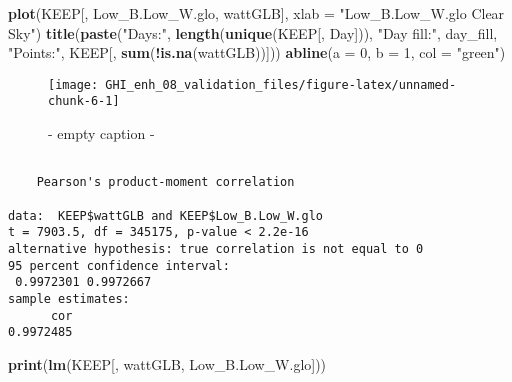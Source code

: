 \documentclass[
  10pt,
  a4paper,oneside]{article}
\newenvironment{Shaded}{\begin{snugshade}}{\end{snugshade}}
\newcommand{\AttributeTok}[1]{\textcolor[rgb]{0.13,0.29,0.53}{#1}}
\newcommand{\DecValTok}[1]{\textcolor[rgb]{0.00,0.00,0.81}{#1}}
\newcommand{\FunctionTok}[1]{\textcolor[rgb]{0.13,0.29,0.53}{\textbf{#1}}}
\newcommand{\NormalTok}[1]{#1}
\newcommand{\SpecialCharTok}[1]{\textcolor[rgb]{0.81,0.36,0.00}{\textbf{#1}}}
\newcommand{\StringTok}[1]{\textcolor[rgb]{0.31,0.60,0.02}{#1}}
\begin{document}
\newpage

\begin{Shaded}
\begin{Highlighting}[]
\FunctionTok{plot}\NormalTok{(KEEP[, Low\_B.Low\_W.glo, wattGLB], }\AttributeTok{xlab =} \StringTok{"Low\_B.Low\_W.glo Clear Sky"}\NormalTok{)}
\FunctionTok{title}\NormalTok{(}\FunctionTok{paste}\NormalTok{(}\StringTok{"Days:"}\NormalTok{, }\FunctionTok{length}\NormalTok{(}\FunctionTok{unique}\NormalTok{(KEEP[, Day])), }\StringTok{"Day fill:"}\NormalTok{, day\_fill, }\StringTok{"Points:"}\NormalTok{, KEEP[, }\FunctionTok{sum}\NormalTok{(}\SpecialCharTok{!}\FunctionTok{is.na}\NormalTok{(wattGLB))]))}
\FunctionTok{abline}\NormalTok{(}\AttributeTok{a =} \DecValTok{0}\NormalTok{, }\AttributeTok{b =} \DecValTok{1}\NormalTok{, }\AttributeTok{col =} \StringTok{"green"}\NormalTok{)}
\end{Highlighting}
\end{Shaded}

\begin{figure}[H]

{\centering \texttt{[image: GHI\_enh\_08\_validation\_files/figure-latex/unnamed-chunk-6-1]} 

}

\caption{ - empty caption - }\label{fig:unnamed-chunk-6}
\end{figure}

\begin{Shaded}
\end{Shaded}

\begin{verbatim}

    Pearson's product-moment correlation

data:  KEEP$wattGLB and KEEP$Low_B.Low_W.glo
t = 7903.5, df = 345175, p-value < 2.2e-16
alternative hypothesis: true correlation is not equal to 0
95 percent confidence interval:
 0.9972301 0.9972667
sample estimates:
      cor 
0.9972485 
\end{verbatim}

\begin{Shaded}
\begin{Highlighting}[]
\FunctionTok{print}\NormalTok{(}\FunctionTok{lm}\NormalTok{(KEEP[, wattGLB, Low\_B.Low\_W.glo]))}
\end{Highlighting}
\end{Shaded}
\end{document}
